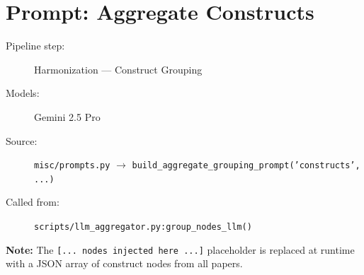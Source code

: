 \section*{Prompt: Aggregate Constructs}
\begin{description}
\item[Pipeline step:] Harmonization --- Construct Grouping
\item[Models:] Gemini 2.5 Pro
\item[Source:] \texttt{misc/prompts.py} $\rightarrow$ \texttt{build\_aggregate\_grouping\_prompt('constructs', ...)}
\item[Called from:] \texttt{scripts/llm\_aggregator.py:group\_nodes\_llm()}
\end{description}
\begin{tcolorbox}[colback=yellow!8,colframe=yellow!50!black,left=4pt,right=4pt,top=4pt,bottom=4pt,arc=2pt]
\textbf{Note:} The \texttt{[... nodes injected here ...]} placeholder is replaced at runtime with a JSON array of construct nodes from all papers.
\end{tcolorbox}

